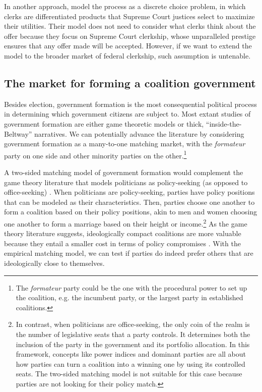 In another approach, \citet{Rozema2016} model the process as a discrete choice
problem, in which clerks are differentiated products that Supreme Court justices
select to maximize their utilities. Their model does not need to consider what
clerks think about the offer because they focus on Supreme Court clerkship,
whose unparalleled prestige ensures that any offer made will be accepted.
However, if we want to extend the model to the broader market of federal
clerkship, such assumption is untenable.

\subsection{The market for forming a coalition government}

Besides election, government formation is the most consequential political
process in determining which government citizens are subject to. Most extant
studies of government formation are either game theoretic models or thick,
``inside-the-Beltway'' narratives. We can potentially advance the literature by
considering government formation as a many-to-one matching market, with the
\textit{formateur} party on one side and other minority parties on the
other.\footnote{The \textit{formateur} party could be the one with the
  procedural power to set up the coalition, e.g. the incumbent party, or the
  largest party in established coalitions.}

A two-sided matching model of government formation would complement the game
theory literature that models politicians as policy-seeking (as opposed to
office-seeking) \citep{Laver1998}. When politicians are policy-seeking, parties
have policy positions that can be modeled as their characteristics. Then,
parties choose one another to form a coalition based on their policy positions,
akin to men and women choosing one another to form a marriage based on their
height or income.\footnote{In contrast, when politicians are office-seeking, the
  only coin of the realm is the number of legislative seats that a party
  controls. It determines both the inclusion of the party in the government and
  its portfolio allocation. In this framework, concepts like power indices and
  dominant parties are all about how parties can turn a coalition into a winning
  one by using its controlled seats. The two-sided matching model is not
  suitable for this case because parties are not looking for their policy
  match.} As the game theory literature suggests, ideologically compact
coalitions are more valuable because they entail a smaller cost in terms of
policy compromises \citep{DeSwaan1973}. With the empirical matching model, we
can test if parties do indeed prefer others that are ideologically close to
themselves.

